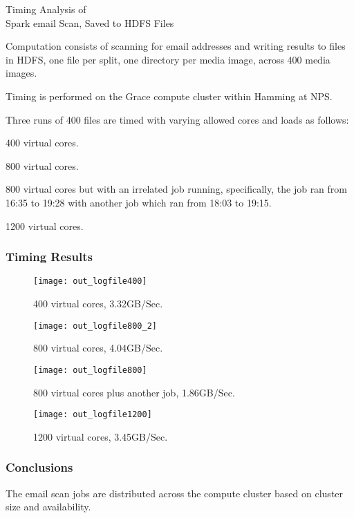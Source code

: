 \documentclass[12pt,twoside]{article}
\begin{document}
\begin{center}
\Large Timing Analysis of\\
\Large Spark email Scan, Saved to HDFS Files
\end{center}

Computation consists of scanning for email addresses and writing results to files in HDFS, one file per split, one directory per media image, across 400 media images.

Timing is performed on the Grace compute cluster within Hamming at NPS.

Three runs of 400 files are timed with varying allowed cores and loads as follows:
\begin{compactitem}
\item 400 virtual cores.
\item 800 virtual cores.
\item 800 virtual cores but with an irrelated job running, specifically, the job ran from 16:35 to 19:28 with another job which ran from 18:03 to 19:15.
\item 1200 virtual cores.
\end{compactitem}

\subsubsection* {Timing Results}

\begin{figure}[H]
  \center
  \texttt{[image: out\_logfile400]}
  \caption*{400 virtual cores, 3.32GB/Sec.}
\end{figure}

\begin{figure}[H]
  \center
  \texttt{[image: out\_logfile800\_2]}
  \caption*{800 virtual cores, 4.04GB/Sec.}
\end{figure}

\begin{figure}[H]
  \center
  \texttt{[image: out\_logfile800]}
  \caption*{800 virtual cores plus another job, 1.86GB/Sec.}
\end{figure}

\begin{figure}[H]
  \center
  \texttt{[image: out\_logfile1200]}
  \caption*{1200 virtual cores, 3.45GB/Sec.}
\end{figure}


\subsubsection*{Conclusions}
\begin{compactitem}
\item The email scan jobs are distributed across the compute cluster based on cluster size and availability.
\end{compactitem}
\end{document}
